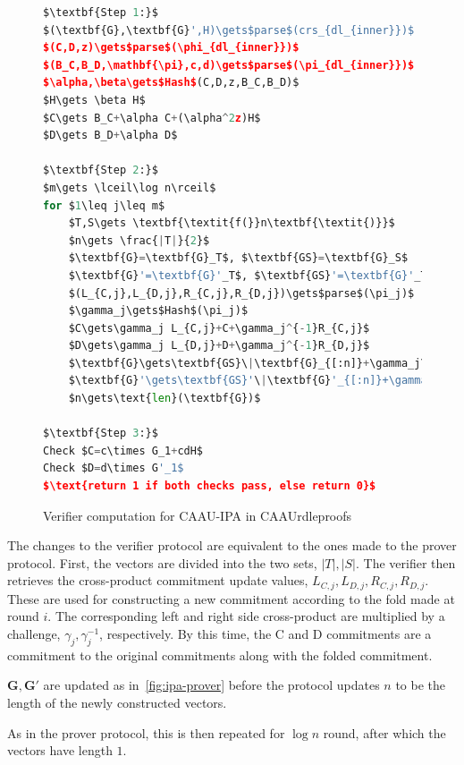 \begin{figure}[ht]
\begin{framed}
\begin{lstlisting}[language=Python,mathescape=true,label={lst:ipa-verifier}]
$\textbf{Step 1:}$
$(\textbf{G},\textbf{G}',H)\gets$parse$(crs_{dl_{inner}})$
$(C,D,z)\gets$parse$(\phi_{dl_{inner}})$
$(B_C,B_D,\mathbf{\pi},c,d)\gets$parse$(\pi_{dl_{inner}})$
$\alpha,\beta\gets$Hash$(C,D,z,B_C,B_D)$
$H\gets \beta H$
$C\gets B_C+\alpha C+(\alpha^2z)H$
$D\gets B_D+\alpha D$

$\textbf{Step 2:}$
$m\gets \lceil\log n\rceil$
for $1\leq j\leq m$
    $T,S\gets \textbf{\textit{f(}}n\textbf{\textit{)}}$
    $n\gets \frac{|T|}{2}$
    $\textbf{G}=\textbf{G}_T$, $\textbf{GS}=\textbf{G}_S$
    $\textbf{G}'=\textbf{G}'_T$, $\textbf{GS}'=\textbf{G}'_T$
    $(L_{C,j},L_{D,j},R_{C,j},R_{D,j})\gets$parse$(\pi_j)$
    $\gamma_j\gets$Hash$(\pi_j)$
    $C\gets\gamma_j L_{C,j}+C+\gamma_j^{-1}R_{C,j}$
    $D\gets\gamma_j L_{D,j}+D+\gamma_j^{-1}R_{D,j}$
    $\textbf{G}\gets\textbf{GS}\|\textbf{G}_{[:n]}+\gamma_j\textbf{G}_{[n:]}$
    $\textbf{G}'\gets\textbf{GS}'\|\textbf{G}'_{[:n]}+\gamma_j^{-1}\textbf{G}'_{[n:]}$
    $n\gets\text{len}(\textbf{G})$

$\textbf{Step 3:}$
Check $C=c\times G_1+cdH$
Check $D=d\times G'_1$
$\text{return 1 if both checks pass, else return 0}$
\end{lstlisting}
\end{framed}
\caption{Verifier computation for CAAU-IPA in CAAUrdleproofs}
\label{fig:ipa-verifier}
\end{figure}

The changes to the verifier protocol are equivalent to the ones made to the prover protocol.
First, the vectors are divided into the two sets, $|T|,|S|$.
The verifier then retrieves the cross-product commitment update values, $L_{C,j},L_{D,j},R_{C,j},R_{D,j}$.
These are used for constructing a new commitment according to the fold made at round $i$.
The corresponding left and right side cross-product are multiplied by a challenge, $\gamma_j,\gamma_j^{-1}$, respectively.
By this time, the C and D commitments are a commitment to the original commitments along with the folded commitment.

$\mathbf{G,G'}$ are updated as in~\autoref{fig:ipa-prover} before the protocol updates $n$ to be the length of the newly constructed vectors.

As in the prover protocol, this is then repeated for $\log n$ round, after which the vectors have length $1$.

